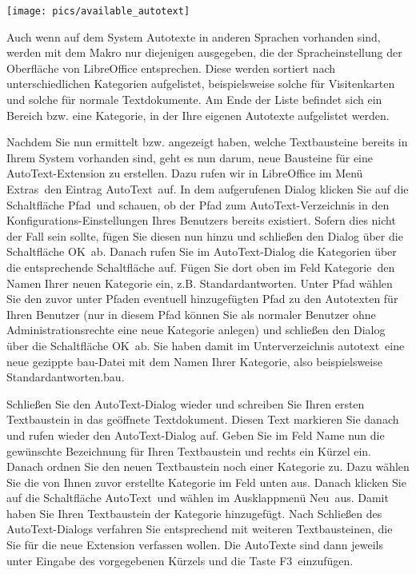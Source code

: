 \documentclass[12pt,a4paper,titlepage]{book}
\begin{document}
\begin{center}
	\captionsetup{type=figure}
	\texttt{[image: pics/available\_autotext]}
	\label{fig:available_autotext}
\end{center}

Auch wenn auf dem System Autotexte in anderen Sprachen vorhanden sind, werden mit dem Makro nur diejenigen ausgegeben, die der Spracheinstellung der Oberfläche von LibreOffice entsprechen. Diese werden sortiert nach unterschiedlichen Kategorien aufgelistet, beispielsweise solche für Visitenkarten und solche für normale Textdokumente. Am Ende der Liste befindet sich ein Bereich bzw. eine Kategorie, in der Ihre eigenen Autotexte aufgelistet werden.

Nachdem Sie nun ermittelt bzw. angezeigt haben, welche Textbausteine bereits in Ihrem System vorhanden sind, geht es nun darum, neue Bausteine für eine AutoText-Extension zu erstellen. Dazu rufen wir in LibreOffice im Menü \glqq Extras\grqq~den Eintrag \glqq AutoText\grqq~auf. In dem aufgerufenen Dialog klicken Sie auf die Schaltfläche \glqq Pfad\grqq~und schauen, ob der Pfad zum AutoText-Verzeichnis in den Konfigurations-Einstellungen Ihres Benutzers bereits existiert. Sofern dies nicht der Fall sein sollte, fügen Sie diesen nun hinzu und schließen den Dialog über die Schaltfläche \glqq OK\grqq~ab. Danach rufen Sie im AutoText-Dialog die Kategorien über die entsprechende Schaltfläche auf. Fügen Sie dort oben im Feld \glqq Kategorie\grqq~den Namen Ihrer neuen Kategorie ein, z.B. \glqq Standardantworten\grqq. Unter Pfad wählen Sie den zuvor unter Pfaden eventuell hinzugefügten Pfad zu den Autotexten für Ihren Benutzer (nur in diesem Pfad können Sie als normaler Benutzer ohne Administrationsrechte eine neue Kategorie anlegen) und schließen den Dialog über die Schaltfläche \glqq OK\grqq~ab. Sie haben damit im Unterverzeichnis \glqq autotext\grqq~eine neue gezippte bau-Datei mit dem Namen Ihrer Kategorie, also beispielsweise \glqq Standardantworten.bau\grqq.

Schließen Sie den AutoText-Dialog wieder und schreiben Sie Ihren ersten Textbaustein in das geöffnete Textdokument. Diesen Text markieren Sie danach und rufen wieder den AutoText-Dialog auf. Geben Sie im Feld Name nun die gewünschte Bezeichnung für Ihren Textbaustein und rechts ein Kürzel ein. Danach ordnen Sie den neuen Textbaustein noch einer Kategorie zu. Dazu wählen Sie die von Ihnen zuvor erstellte Kategorie im Feld unten aus. Danach klicken Sie auf die Schaltfläche \glqq AutoText\grqq~und wählen im Ausklappmenü \glqq Neu\grqq~aus. Damit haben Sie Ihren Textbaustein der Kategorie hinzugefügt. Nach Schließen des AutoText-Dialogs verfahren Sie entsprechend mit weiteren Textbausteinen, die Sie für die neue Extension verfassen wollen. Die AutoTexte sind dann jeweils unter Eingabe des vorgegebenen Kürzels und die Taste \glqq F3\grqq~einzufügen.
\end{document}
